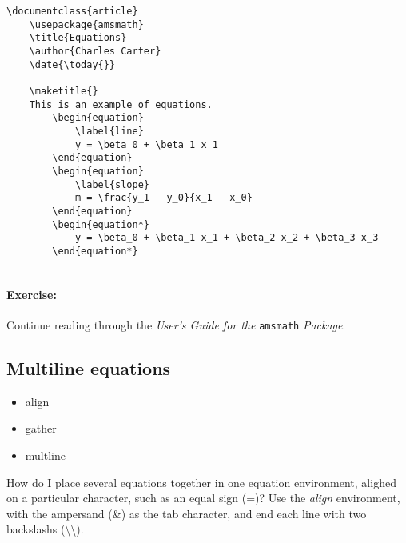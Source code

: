         \begin{verbatim}
\documentclass{article}
	\usepackage{amsmath}
    \title{Equations}
    \author{Charles Carter}
    \date{\today{}}
 
    \maketitle{}
	This is an example of equations.
		\begin{equation}
			\label{line}
			y = \beta_0 + \beta_1 x_1
		\end{equation}
		\begin{equation}
			\label{slope}
			m = \frac{y_1 - y_0}{x_1 - x_0}
		\end{equation}
		\begin{equation*}
			y = \beta_0 + \beta_1 x_1 + \beta_2 x_2 + \beta_3 x_3
		\end{equation*}
	    
        \end{verbatim}

		\paragraph{Exercise:}Continue reading through the \textit{User's Guide for the }\texttt{amsmath} \textit{Package}.

        \subsection{Multiline equations}
        \label{Multiline equations}
        
        \begin{cmd}
            \begin{itemize}
                \item{align}
                \item{gather}
                \item{multline}
            \end{itemize}
        \end{cmd}

		How do I place several equations together in one equation environment, alighed on a particular character, such as an equal sign (=)? Use the \textit{align} environment, with the ampersand (\&) as the tab character, and end each line with two backslashs (\textbackslash{}\textbackslash{}).

